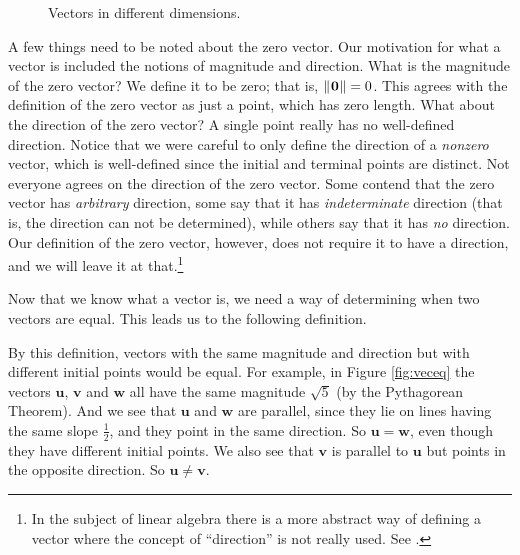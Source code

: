 \begin{figure}[h]
 \centering
 \qquad
 \qquad
 \caption[]{\quad Vectors in different dimensions.}
 \label{fig:vecs}
\end{figure}

A few things need to be noted about the zero vector.
Our motivation for what a vector is included the notions of
magnitude and direction. 
What is the magnitude of the zero vector? 
We define it to be zero; that is,
$\lVert\mspace{1mu}\mathbf{0}\mspace{1mu}\rVert = 0$.
This agrees with the definition of the zero vector as just a point, which has zero length.  What about the
direction of the zero vector?  A single point really has no well-defined direction.  Notice that we were careful
to only define the direction of a \emph{nonzero} vector, which is well-defined since the initial and
terminal points are distinct.
Not everyone agrees on the direction of the zero vector.  Some contend that the zero vector has \emph{arbitrary}
direction, some say that it has \emph{indeterminate} direction (that is, the direction can
not be determined), 
while others say that it has \emph{no} direction. Our definition of the zero vector, however,
does not require it to have a direction, and we will leave it at that.\footnote{In the subject of linear algebra
there is a more abstract way of defining a vector where the concept of ``direction'' is not really used.
See \cite{ar}.}

Now that we know what a vector is, we need a way of determining when two vectors are equal.  This leads us to the
following definition.

By this definition, vectors with the same magnitude and direction but with different initial points would be
equal. 
For example, in Figure \ref{fig:veceq} the vectors $\mathbf{u}$, $\mathbf{v}$ and $\mathbf{w}$ all have the same
magnitude $\sqrt 5$ (by the Pythagorean Theorem).  
And we see that $\mathbf{u}$ and $\mathbf{w}$ are parallel, since they
lie on lines having the same slope $\frac{1}{2}$, and they point in the same direction. So $\mathbf{u} = \mathbf{w}$,
even though they have different initial points.  
We also see that $\mathbf{v}$ is parallel to $\mathbf{u}$ but points in the
opposite direction. So $\mathbf{u} \ne \mathbf{v}$.

